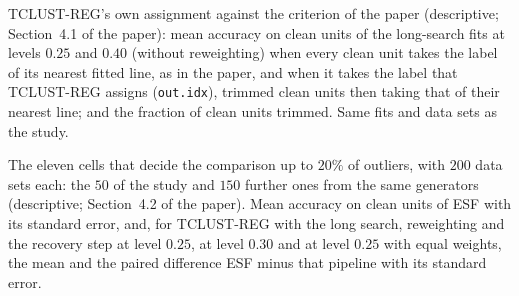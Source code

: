 \begin{table}[htbp]
\centering
\footnotesize
\caption{TCLUST-REG's own assignment against the criterion of the paper (descriptive;
Section~4.1 of the paper): mean accuracy on clean units of the long-search fits at levels $0.25$
and $0.40$ (without reweighting) when every clean unit takes the label of its nearest fitted line,
as in the paper, and when it takes the label that TCLUST-REG assigns (\texttt{out.idx}), trimmed
clean units then taking that of their nearest line; and the fraction of clean units trimmed.
Same fits and data sets as the study.}
\label{tab:S49}
\resizebox{\textwidth}{!}{}
\end{table}

\begin{table}[htbp]
\centering
\footnotesize
\caption{The eleven cells that decide the comparison up to $20\%$ of outliers, with $200$ data
sets each: the $50$ of the study and $150$ further ones from the same generators (descriptive;
Section~4.2 of the paper). Mean accuracy on clean units of ESF with its standard error, and, for
TCLUST-REG with the long search, reweighting and the recovery step at level $0.25$, at level
$0.30$ and at level $0.25$ with equal weights, the mean and the paired difference ESF minus that
pipeline with its standard error.}
\label{tab:S50}
\resizebox{\textwidth}{!}{}
\end{table}
